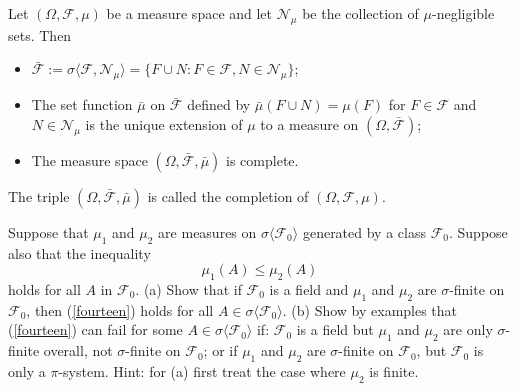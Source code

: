 \begin{theorem}
Let $(\Omega,\mathcal F, \mu)$ be a measure space and let $\mathcal N_\mu$ be the collection of $\mu$-negligible sets.
Then
\begin{itemize}
\item $\bar {\mathcal F}:= \sigma\langle \mathcal F, \mathcal N_\mu\rangle = \{F\cup N: F\in \mathcal F, N\in \mathcal N_\mu  \}$;
\item The set function $\bar \mu$ on $\bar{\mathcal F}$ defined by $\bar\mu(F\cup N)= \mu(F)$ for $F\in\mathcal F$ and $N\in \mathcal N_\mu$ is the unique extension of $\mu$ to a measure on $(\Omega, \bar{\mathcal F})$;
\item The measure space $(\Omega, \bar{\mathcal F}, \bar \mu)$ is complete.
\end{itemize}
The triple $(\Omega, \bar{\mathcal F}, \bar \mu)$ is called the {completion} of  $(\Omega, \mathcal F, \mu)$.
\end{theorem}





\begin{exercise}
Suppose that $\mu_1$ and $\mu_2$ are measures on  $\sigma\langle \mathcal F_0\rangle$ generated by a class $\mathcal F_0$. Suppose also that the inequality
\begin{equation}
\label{fourteen}
\mu_1(A)\leq \mu_2(A)
\end{equation}
holds for all $A$ in $\mathcal F_0$. (a) Show that if $\mathcal F_0$ is a field and $\mu_1$ and $\mu_2$ are $\sigma$-finite on $\mathcal F_0$, then (\ref{fourteen}) holds for all $A\in\sigma\langle \mathcal F_0\rangle$. (b) Show by examples that (\ref{fourteen}) can fail for some $A\in\sigma\langle \mathcal F_0\rangle$ if: $\mathcal F_0$ is a field but $\mu_1$ and $\mu_2$ are only $\sigma$-finite  overall, not $\sigma$-finite on $\mathcal F_0$; or if $\mu_1$ and $\mu_2$ are $\sigma$-finite on $\mathcal F_0$, but $\mathcal F_0$ is only a $\pi$-system. Hint: for (a) first treat the case where $\mu_2$ is finite.
\end{exercise}




